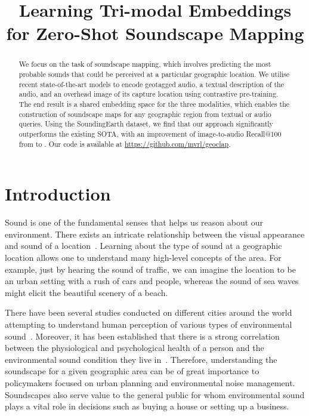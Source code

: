 \documentclass{bmvc2k}
\title{Learning Tri-modal Embeddings for Zero-Shot Soundscape Mapping}
\begin{document}
\maketitle

\begin{abstract}
We focus on the task of soundscape mapping, which involves predicting the most probable sounds that could be perceived at a particular geographic location. We utilise recent state-of-the-art models to encode geotagged audio, a textual description of the audio, and an overhead image of its capture location using contrastive pre-training. The end result is a shared embedding space for the three modalities, which enables the construction of soundscape maps for any geographic region from textual or audio queries. Using the SoundingEarth dataset, we find that our approach significantly outperforms the existing SOTA, with an improvement of image-to-audio Recall@100 from  to . Our code is available at \url{https://github.com/mvrl/geoclap}.
\end{abstract}

\section{Introduction}
\label{sec:intro}









Sound is one of the fundamental senses that helps us reason about our environment. There exists an intricate relationship between the visual appearance and sound of a location~\cite{gonzalez2023effects,garzon2023relationships}. Learning about the type of sound at a geographic location allows one to understand many high-level concepts of the area. For example, just by hearing the sound of traffic, we can imagine the location to be an urban setting with a rush of cars and people, whereas the sound of sea waves might elicit the beautiful scenery of a beach. 

There have been several studies conducted on different cities around the world attempting to understand human perception of various types of environmental sound~\cite{aramaki2023image,garzon2023relationships,ooi2023araus,picaut2019open,lionello2020systematic,aiello2016chatty}. Moreover, it has been established that there is a strong correlation between the physiological and psychological health of a person and the environmental sound condition they live in~\cite{lercher2023soundscape,cui2022research,radicchi2021sound}. Therefore, understanding the soundscape for a given geographic area can be of great importance to policymakers focused on urban planning and environmental noise management. Soundscapes also serve value to the general public for whom environmental sound plays a vital role in decisions such as buying a house or setting up a business.
\end{document}
